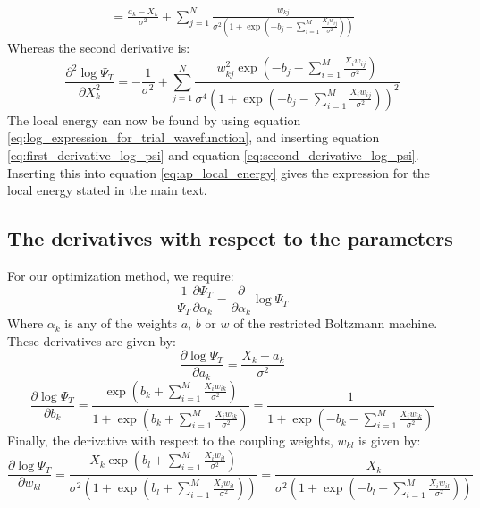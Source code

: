 \documentclass[a4paper, 10pt]{article}
\begin{document}
\begin{appendices}
\begin{equation}
\begin{split}
	=\frac{a_k-X_k}{\sigma^2}+\sum_{j=1}^N \frac{w_{kj}}{\sigma^2 \left(1+ \exp \left(-b_j-\sum_{i=1}^{M} \frac{X_iw_{ij}}{\sigma^2}\right)\right)}
	\end{split}
	\end{equation}
	Whereas the second derivative is:
	\begin{equation}\label{eq:second_derivative_log_psi}
	\frac{\partial^2 \log \Psi_T}{\partial X_k^2}=-\frac{1}{\sigma^2}+\sum_{j=1}^N \frac{w_{kj}^2 \exp \left(-b_j-\sum_{i=1}^{M}\frac{X_iw_{ij}}{\sigma^2} \right)}{\sigma^4\left(1+ \exp \left(-b_j-\sum_{i=1}^{M} \frac{X_iw_{ij}}{\sigma^2}\right)\right)^2}
	\end{equation}
	The local energy can now be found by using equation \ref{eq:log_expression_for_trial_wavefunction}, and inserting equation \ref{eq:first_derivative_log_psi} and equation \ref{eq:second_derivative_log_psi}. Inserting this into equation \ref{eq:ap_local_energy} gives the expression for the local energy stated in the main text.
	\subsection{The derivatives with respect to the parameters}\label{ap:derivative_parameters}
	For our optimization method, we require:
	\begin{equation}
	\frac{1}{\Psi_T}\frac{\partial \Psi_T}{\partial \alpha_k}=\frac{\partial }{\partial \alpha_k}\log \Psi_T
	\end{equation}
	Where $\alpha_k$ is any of the weights $a$, $b$ or $w$ of the restricted Boltzmann machine. These derivatives are given by:
	\begin{equation}
	\frac{\partial \log \Psi_T }{\partial a_k}=\frac{X_k-a_k}{\sigma^2}
	\end{equation}
	\begin{equation}
	\frac{\partial \log \Psi_T}{\partial b_k}=\frac{\exp \left(b_k+\sum_{i=1}^M \frac{X_iw_{ik}}{\sigma^2}\right)}{1+\exp \left(b_k+\sum_{i=1}^M \frac{X_iw_{ik}}{\sigma^2}\right)}=\frac{1}{1+\exp \left(-b_k-\sum_{i=1}^M \frac{X_i w_{ik}}{\sigma^2}\right)}
	\end{equation}
	Finally, the derivative with respect to the coupling weights, $w_{kl}$ is given by:
	\begin{equation}
	\frac{\partial \log \Psi_T}{\partial w_{kl}}=\frac{X_k\exp\left(b_l+\sum_{i=1}^M \frac{X_iw_{il}}{\sigma^2}\right)}{\sigma^2\left(1+\exp \left( b_l + \sum_{i=1}^M \frac{X_iw_{il}}{\sigma^2}\right)\right)}=\frac{X_k}{\sigma^2\left(1+\exp \left(-b_l-\sum_{i=1}^M \frac{X_iw_{il}}{\sigma^2}\right)\right)}
	\end{equation}

\end{appendices}
\end{document}
